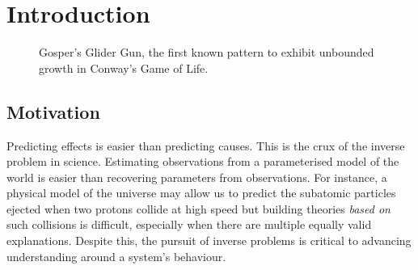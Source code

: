 \chapter{Introduction}

\begin{figure}[!h]
\centering
            \hfill
            \hfill
            \hfill
            \hfill
            \caption{Gosper's Glider Gun, the first known pattern to exhibit unbounded growth in Conway's Game of Life.\cite{hickerson}}
\label{fig:gospers-glider}
\end{figure}

\section{Motivation}
Predicting effects is easier than predicting causes. This is the crux of the inverse problem in science. Estimating observations from a parameterised model of the world is easier than recovering parameters from observations. For instance, a physical model of the universe may allow us to predict the subatomic particles ejected when two protons collide at high speed but building theories \textit{based on} such collisions is difficult, especially when there are multiple equally valid explanations. Despite this, the pursuit of inverse problems is critical to advancing understanding around a system's behaviour.\\

